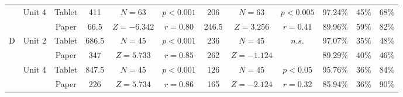\begin{tabular}{|c|c|c|ccc|ccc|c|c|c|}
\cline{2-12}
 & 
\multirow{2}{*}{Unit 4}  & 
Tablet & 411 & \scriptsize{$N=63$} & \scriptsize{$p<0.001$} & 206 & \scriptsize{$N=63$} & \scriptsize{$p<0.005$} & 97.24\% & 45\% & 68\% \\
 & 
 & 
Paper & 66.5 & \scriptsize{$Z=-6.342$} & \scriptsize{$r=0.80$} & 246.5 & \scriptsize{$Z=3.256$} & \scriptsize{$r=0.41$} & 89.96\% & 59\% & 82\% \\
\hline
\hline
\multirow{4}{*}{D}  & 
\multirow{2}{*}{Unit 2}  & 
Tablet & 686.5 & \scriptsize{$N=45$} & \scriptsize{$p<0.001$} & 236 & \scriptsize{$N=45$} & \scriptsize{$n.s.$} & 97.07\% & 35\% & 48\% \\
 & 
 & 
Paper & 347 & \scriptsize{$Z=5.733$} & \scriptsize{$r=0.85$} & 262 & \scriptsize{$Z=-1.124$} &  & 89.29\%  & 40\% & 46\% \\
\cline{2-12}
 & 
\multirow{2}{*}{Unit 4}  & 
Tablet & 847.5 & \scriptsize{$N=45$} & \scriptsize{$p<0.001$} & 126 & \scriptsize{$N=45$} & \scriptsize{$p<0.05$} & 95.76\% & 36\% & 84\% \\
 & 
 & 
Paper & 226 & \scriptsize{$Z=5.734$} & \scriptsize{$r=0.86$} & 165 & \scriptsize{$Z=-2.124$} & \scriptsize{$r=0.32$} & 85.94\% & 36\% &90\% \\
\hline
\end{tabular}
